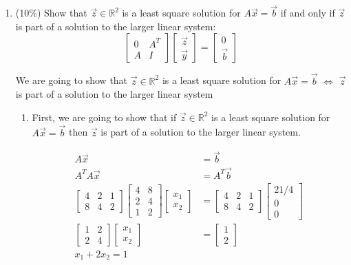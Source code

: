 \documentclass[a4paper,10pt]{article}
\begin{document}
\begin{enumerate}
\begin{enumerate}
    \item (10\%) Show that $\vec{z}\in \mathbb{R}^2$ is a least square solution for $A\vec{x}=\vec{b}$ if and only if $\vec{z}$ is part of a solution to the larger linear system:
    \[
        \left[ \begin{array}{cc}0 & A^T \\ A & I\end{array} \right] \left[\begin{array}{cc} \vec{z} \\ \vec{y} \end{array}\right] = \left[\begin{array}{cc} 0 \\ \vec{b}\end{array}\right]
    \]
    {\color{blue}
        We are going to show that $\vec{z}\in \mathbb{R}^2$ is a least square solution for $A\vec{x}=\vec{b}$ $\iff$ $\vec{z}$ is part of a solution to the larger linear system
        \begin{enumerate}
        \item
            First, we are going to show that if $\vec{z}\in \mathbb{R}^2$ is a least square solution for $A\vec{x}=\vec{b}$ then $\vec{z}$ is part of a solution to the larger linear system.
            
            \begin{align}
                A\vec{x} &= \vec{b} \\
                A^T A \vec{x} &= A^T \vec{b} \\
                \begin{bmatrix}4 & 2 & 1 \\ 8 & 4 & 2\end{bmatrix} \begin{bmatrix}4 & 8 \\ 2 & 4 \\ 1 & 2\end{bmatrix} \begin{bmatrix} x_1 \\ x_2 \end{bmatrix} &= \begin{bmatrix}4 & 2 & 1 \\ 8 & 4 & 2\end{bmatrix} \begin{bmatrix}21/4 \\ 0 \\ 0\end{bmatrix} \\
                \begin{bmatrix} 1 & 2 \\ 2 & 4 \end{bmatrix} \begin{bmatrix} x_1 \\ x_2 \end{bmatrix} &= \begin{bmatrix} 1 \\ 2 \end{bmatrix} \\
                x_1 + 2 x_2 = 1
            \end{align}
    

\end{enumerate}}
\end{enumerate}
\end{enumerate}
\end{document}

